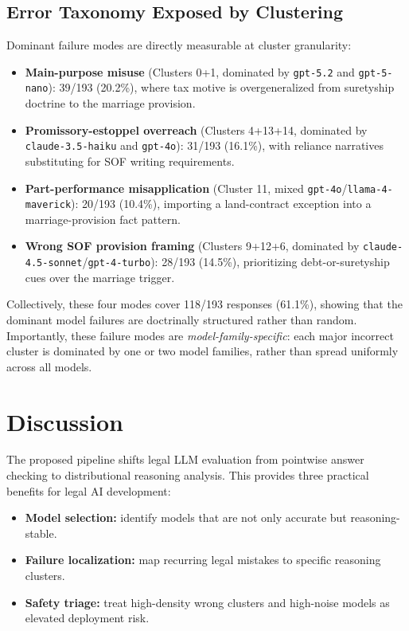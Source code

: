 \documentclass[11pt]{article}
\begin{document}
\subsection{Error Taxonomy Exposed by Clustering}
Dominant failure modes are directly measurable at cluster granularity:
\begin{itemize}[leftmargin=1.5em]
    \item \textbf{Main-purpose misuse} (Clusters 0+1, dominated by \texttt{gpt-5.2} and \texttt{gpt-5-nano}): 39/193 (20.2\%), where tax motive is overgeneralized from suretyship doctrine to the marriage provision.
    \item \textbf{Promissory-estoppel overreach} (Clusters 4+13+14, dominated by \texttt{claude-3.5-haiku} and \texttt{gpt-4o}): 31/193 (16.1\%), with reliance narratives substituting for SOF writing requirements.
    \item \textbf{Part-performance misapplication} (Cluster 11, mixed \texttt{gpt-4o}/\texttt{llama-4-maverick}): 20/193 (10.4\%), importing a land-contract exception into a marriage-provision fact pattern.
    \item \textbf{Wrong SOF provision framing} (Clusters 9+12+6, dominated by \texttt{claude-4.5-sonnet}/\texttt{gpt-4-turbo}): 28/193 (14.5\%), prioritizing debt-or-suretyship cues over the marriage trigger.
\end{itemize}

Collectively, these four modes cover 118/193 responses (61.1\%), showing that the dominant model failures are doctrinally structured rather than random. Importantly, these failure modes are \emph{model-family-specific}: each major incorrect cluster is dominated by one or two model families, rather than spread uniformly across all models.

\section{Discussion}
The proposed pipeline shifts legal LLM evaluation from pointwise answer checking to distributional reasoning analysis. This provides three practical benefits for legal AI development:
\begin{itemize}[leftmargin=1.5em]
    \item \textbf{Model selection:} identify models that are not only accurate but reasoning-stable.
    \item \textbf{Failure localization:} map recurring legal mistakes to specific reasoning clusters.
    \item \textbf{Safety triage:} treat high-density wrong clusters and high-noise models as elevated deployment risk.
\end{itemize}
\end{document}
